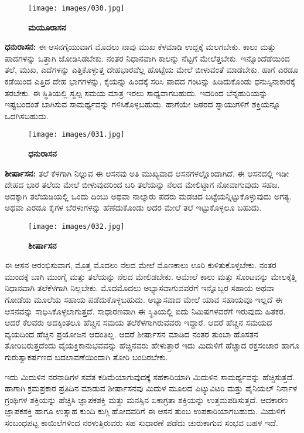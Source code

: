 \begin{figure}
\texttt{[image: images/030.jpg]}
\caption{\textbf{ಮಯೂರಾಸನ} }
\end{figure}

\textbf{  ಧನುರಾಸನ:} ಈ ಆಸನಗೈಯುವಾಗ ಮೊದಲು ನಾವು ಮುಖ ಕೆಳಮಾಡಿ ಉದ್ದಕ್ಕೆ ಮಲಗಬೇಕು. ಕಾಲು ಮತ್ತು ಪಾದಗಳನ್ನು ಒತ್ತಾಗಿ ಜೋಡಿಸಿಡಬೇಕು. ನಂತರ ನಿಧಾನವಾಗಿ ಕಾಲನ್ನು ನೆಟ್ಟಗೆ ಮೇಲೆತ್ತಬೇಕು. ಇನ್ನೊಂದೆಡೆಯಿಂದ ತಲೆ, ಮುಖ, ಎದೆಗಳನ್ನು ಎತ್ತಿಕೊಳ್ಳುತ್ತ ದೇಹಭಾರವೆಲ್ಲ ಹೊಟ್ಟೆಯ ಮೇಲೆ ಬೀಳುವಂತೆ ಮಾಡಬೇಕು. ಹಾಗೆ ಎರಡೂ ಕಡೆಯಿಂದ ಎತ್ತಿದ ದೇಹ ಭಾಗಗಳನ್ನು, ಕೈಯನ್ನು ಹಿಂದಕ್ಕೆ ಸರಿಸಿ ಪಾದದ ಗಂಟನ್ನು ಹಿಡಿದುಕೊಂಡು ಧನುಸ್ಸಿನಾಕಾರಕ್ಕೆ ತರಬೇಕು. ಈ ಸ್ಥಿತಿಯಲ್ಲಿ ಸ್ವಲ್ಪ ಸಮಯ ಮಾತ್ರ ಇರಲು ಸಾಧ್ಯವಾಗಬಹುದು. ಇದರಿಂದ ಬೆನ್ನಹುರಿಯನ್ನು ಇಷ್ಟಬಂದಂತೆ ಬಾಗಿಸುವ ಸಾಮರ್ಥ್ಯವನ್ನು ಗಳಿಸಿಕೊಳ್ಳಬಹುದು. ಹಾಗೆಯೇ ಜಠರದ ಸ್ನಾಯುಗಳಿಗೆ ಶಕ್ತಿಯನ್ನೂ ಒದಗಿಸಬಹುದು.

\begin{figure}
\texttt{[image: images/031.jpg]}
\caption{\textbf{ಧನುರಾಸನ} }
\end{figure}

\textbf{  ಶೀರ್ಷಾಸನ:} ತಲೆ ಕೆಳಗಾಗಿ ನಿಲ್ಲುವ ಈ ಆಸನವು ಅತಿ ಮುಖ್ಯವಾದ ಆಸನಗಳಲ್ಲೊಂದಾಗಿದೆ. ಈ ಆಸನದಲ್ಲಿ ಇಡೀ ದೇಹದ ಭಾರ ತಲೆಯ ಮೇಲೆ ಬೀಳುವುದರಿಂದ ಬರಿ ತಲೆಯನ್ನು ನೆಲದ ಮೇಲಿಟ್ಟಾಗ ನೋವಾಗುವುದು ಸಹಜ. ಅದಕ್ಕಾಗಿ ತಲೆಯಡಿಯಲ್ಲಿ ಒಂದು ದಿಂಬು ಅಥವಾ ನಾಲ್ಕಾರು ಪದರು ಮಡಚಿದ ಬಟ್ಟೆಯನ್ನಿಟ್ಟುಕೊಳ್ಳುವುದು ಅಗತ್ಯ. ಅಥವಾ ಎರಡೂ ಕೈಗಳ ಬೆರಳುಗಳನ್ನು ಹೆಣೆದುಕೊಂಡು ಅದರ ಮೇಲೆ ತಲೆ ಇಟ್ಟುಕೊಳ್ಳಲೂ ಬಹುದು.

\begin{figure}
\texttt{[image: images/032.jpg]}
\caption{\textbf{ಶೀರ್ಷಾಸನ} }
\end{figure}

ಈ ಆಸನ ಆರಂಭಿಸುವಾಗ, ಮೊತ್ತ ಮೊದಲು ನೆಲದ ಮೇಲೆ ಮೊಣಕಾಲು ಊರಿ ಕುಳಿತುಕೊಳ್ಳಬೇಕು. ನಂತರ ಮುಂದಕ್ಕೆ ಬಾಗಿ ಮುಂಗೈ ಮತ್ತು ತಲೆಯನ್ನು ನೆಲದ ಮೇಲಿಡಬೇಕು. ಆಮೇಲೆ ಕಾಲು ಮತ್ತು ಸೊಂಟವನ್ನು ಮೇಲಕ್ಕೆತ್ತಿ ನಿಧಾನವಾಗಿ ತಲೆಕೆಳಗಾಗಿ ನಿಲ್ಲಬೇಕು. ಮೊದಮೊದಲು ಅಭ್ಯಾಸವಾಗುವವರೆಗೆ ಇನ್ನೊಬ್ಬರ ಸಹಾಯ ಅಥವಾ ಗೋಡೆಯ ಮೂಲೆಯ ಸಹಾಯ ಪಡೆದುಕೊಳ್ಳಬಹುದು. ಅಭ್ಯಾಸವಾದ ಮೇಲೆ ಯಾವ ಸಹಾಯವೂ ಇಲ್ಲದೆ ಈ ಆಸನವನ್ನು ಸಾಧಿಸಿಕೊಳ್ಳಲಾಗುತ್ತದೆ. ಸಾಧಾರಣವಾಗಿ ಈ ಸ್ಥಿತಿಯಲ್ಲಿ ಐದು ನಿಮಿಷಗಳವರೆಗೆ ಇರುವುದು ಹಿತಕರ. ಆದರೆ ಕೆಲವರು ಅದಕ್ಕಿಂತಲೂ ಹೆಚ್ಚಿನ ಸಮಯ ತಲೆಕೆಳಗಾಗಿರುವವರು ಇದ್ದಾರೆ. ಆದರೆ ಹೆಚ್ಚಿನ ಸಮಯದ ವ್ಯಯದಿಂದ ಹೆಚ್ಚಿನ ಪ್ರಯೋಜನ ಆದಂತಿಲ್ಲ. ಆದರೆ ಶೀರ್ಷಾಸನ ಮಾಡಿದ ನಂತರ ತುಂಬಾ ಹೊಸತನ ತೋರಿಬರುತ್ತದೆಂದು ವೈಯಕ್ತಿಕಾನುಭವವನ್ನು ಹೆಚ್ಚಿನವರು ಹೇಳುತ್ತಾರೆ ಇದು ಮಿದುಳಿಗೆ ಹೆಚ್ಚಾದ ರಕ್ತಸಂಚಾರ ಹಾಗೂ ಗುರುತ್ವಾಕರ್ಷಣದ ಬದಲಾವಣೆಯಿಂದಾಗಿ ತೋರಿ ಬಂದಿರಬೇಕು.

ಇದು ಮಿದುಳಿನ ನರನಾಡಿಗಳ ಸವೆತ ಕಡಿಮೆಯಾಗುವುದಕ್ಕೆ ಸಹಕಾರಿಯಾಗಿ ಮಿದುಳಿನ ಸಾಮರ್ಥ್ಯವನ್ನು ಹೆಚ್ಚಿಸುತ್ತದೆ. ಹಾಗಾಗಿ ಕ್ರಮಪ್ರಕಾರ ಪ್ರತಿದಿನ ಮಾಡುವ ಶೀರ್ಷಾಸನವು ಮಿದುಳ ಮೂಲದ ಪಿಟ್ಯುವಿಟರಿ ಮತ್ತು ಪೈನಿಯಲ್ ನಿರ್ನಾಳ ಗ್ರಂಥಿಗಳ ಶಕ್ತಿಯನ್ನು ಹೆಚ್ಚಿಸಿ ಜ್ಞಾಪಕಶಕ್ತಿ ಮತ್ತು ಮನಸ್ಸಿನ ಏಕಾಗ್ರತಾ ಶಕ್ತಿಯನ್ನು ಉತ್ತಮಪಡಿಸುತ್ತದೆ. ಆದಕಾರಣ ಜ್ಞಾಪಕಶಕ್ತಿ ಹಾಗೂ ಉತ್ಸಾಹ ಕುಂದಿ ಕುಗ್ಗಿ ಹೋದವರಿಗೆ ಈ ಆಸನ ತುಂಬ ಉಪಕಾರಿಯಾಗಬಹುದು. ಮಿದುಳಿಗೆ ಸಂಬಂಧಪಟ್ಟ ಕಾಯಿಲೆಗಳಿಂದ ನರಳುತ್ತಿರುವರು ಸಹ ಸುಧಾರಣೆ ಪಡೆದು ಚುರುಕಾಗುವ ಸಂಭವ ಬಹಳ ಇದೆ.

